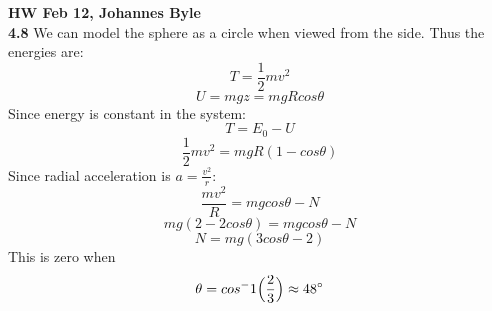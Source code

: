 \documentclass[english]{article}
\begin{document}
\textbf{HW Feb 12, Johannes Byle}\\

\noindent
\textbf{4.8} We can model the sphere as a circle when viewed from the side. Thus the energies are:\\
$$T=\frac{1}{2}mv^2$$ $$U=mgz=mgRcos\theta$$
Since energy is constant in the system:
$$T=E_0-U$$ $$\frac{1}{2}mv^2=mgR(1-cos\theta)$$
Since radial acceleration is $a=\frac{v^2}{r}$:
$$\frac{mv^2}{R}=mgcos\theta-N$$
$$mg(2-2cos\theta)=mgcos\theta-N$$
$$N=mg(3cos\theta-2)$$
This is zero when 
$$\theta=cos^-1\Big(\frac{2}{3}\Big)\approx48\degree$$
\end{document}

